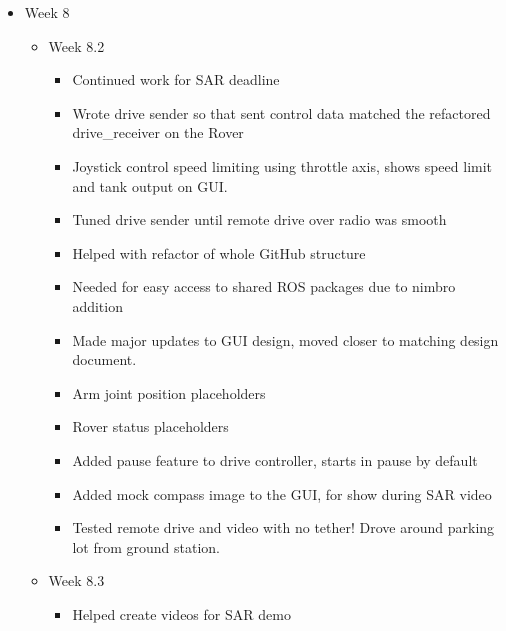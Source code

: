 \begin{itemize}
\item Week 8
	\begin{itemize}
	\item Week 8.2
      \begin{itemize}
      \item Continued work for SAR deadline 
      \item Wrote drive sender so that sent control data matched the refactored drive\_receiver on the Rover 
      \item Joystick control speed limiting using throttle axis, shows speed limit and tank output on GUI. 
      \item Tuned drive sender until remote drive over radio was smooth 
      \item Helped with refactor of whole GitHub structure 
      \item Needed for easy access to shared ROS packages due to nimbro addition 
      \item Made major updates to GUI design, moved closer to matching design document.  
      \item Arm joint position placeholders 
      \item Rover status placeholders 
      \item Added pause feature to drive controller, starts in pause by default 
      \item Added mock compass image to the GUI, for show during SAR video 
      \item Tested remote drive and video with no tether! Drove around parking lot from ground station. 
      \end{itemize}
	\item Week 8.3
      \begin{itemize}
      \item Helped create videos for SAR demo 
      \end{itemize}
    

\end{itemize}
\end{itemize}
